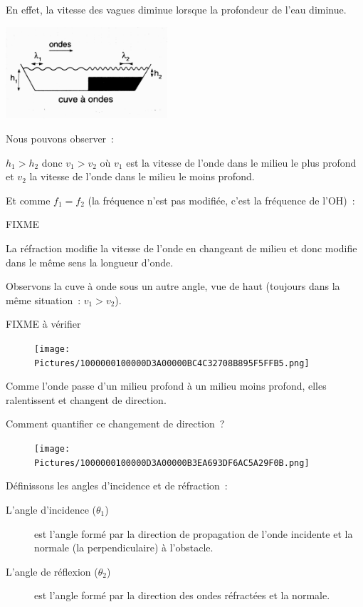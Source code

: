 En effet, la vitesse des vagues diminue lorsque la profondeur de l'eau
diminue.

\includegraphics[width=6.017cm,height=3.408cm]{Pictures/1000000100000A3C000005CCA7E68DBE45CF2A53.png}

Nous pouvons observer~:

$h_1 > h_2$ donc $v_1 > v_2$
où $v_1$ est la vitesse de l'onde dans le milieu le plus profond et $v_2$ la
vitesse de l'onde dans le milieu le moins profond.

Et comme $f_1 = f_2$ (la fréquence n'est pas modifiée, c'est la fréquence de
l'OH)~:

FIXME 

La réfraction modifie la vitesse de l'onde en changeant de milieu et
donc modifie dans le même sens la longueur d'onde.

Observons la cuve à onde sous un autre angle, vue de haut (toujours dans
la même situation~: $v_1>  v_2$).

FIXME à vérifier

\begin{figure}
\centering
\texttt{[image: Pictures/1000000100000D3A00000BC4C32708B895F5FFB5.png]}
\caption{}
\end{figure}

Comme l'onde passe d'un milieu profond à un milieu moins profond, elles
ralentissent et changent de direction.

Comment quantifier ce changement de direction~?

\begin{figure}
\centering
\texttt{[image: Pictures/1000000100000D3A00000B3EA693DF6AC5A29F0B.png]}
\caption{}
\end{figure}

Définissons les angles d'incidence et de réfraction~:
\begin{description}
	\item[L'angle d'incidence ($\theta_1$)] est l'angle formé par la direction
de propagation de l'onde incidente et la normale (la perpendiculaire) à
l'obstacle. 
    \item[L'angle de réflexion ($\theta_2$)] est l'angle formé par la direction
des ondes réfractées et la normale.
\end{description}

